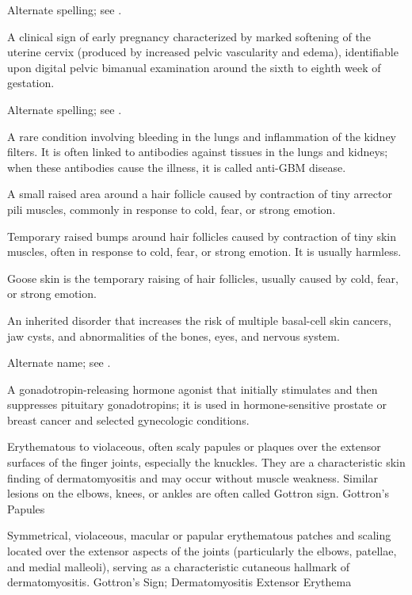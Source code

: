  Alternate spelling; see .

 A clinical sign of early pregnancy characterized by marked softening of the uterine cervix (produced by increased pelvic vascularity and edema), identifiable upon digital pelvic bimanual examination around the sixth to eighth week of gestation.

 Alternate spelling; see .

 A rare condition involving bleeding in the lungs and inflammation of the kidney filters. It is often linked to antibodies against tissues in the lungs and kidneys; when these antibodies cause the illness, it is called anti-GBM disease.

 A small raised area around a hair follicle caused by contraction of tiny arrector pili muscles, commonly in response to cold, fear, or strong emotion.

 Temporary raised bumps around hair follicles caused by contraction of tiny skin muscles, often in response to cold, fear, or strong emotion. It is usually harmless.

 Goose skin is the temporary raising of hair follicles, usually caused by cold, fear, or strong emotion.

 An inherited disorder that increases the risk of multiple basal-cell skin cancers, jaw cysts, and abnormalities of the bones, eyes, and nervous system.

 Alternate name; see .

 A gonadotropin-releasing hormone agonist that initially stimulates and then suppresses pituitary gonadotropins; it is used in hormone-sensitive prostate or breast cancer and selected gynecologic conditions.

 Erythematous to violaceous, often scaly papules or plaques
over the extensor surfaces of the finger joints, especially the knuckles. They are a
characteristic skin finding of dermatomyositis and may occur without muscle weakness.
Similar lesions on the elbows, knees, or ankles are often called Gottron sign.
\synonyms
Gottron's Papules

 Symmetrical, violaceous, macular or papular erythematous patches and scaling located over the extensor aspects of the joints (particularly the elbows, patellae, and medial malleoli), serving as a characteristic cutaneous hallmark of dermatomyositis.
\synonyms
Gottron's Sign; Dermatomyositis Extensor Erythema

